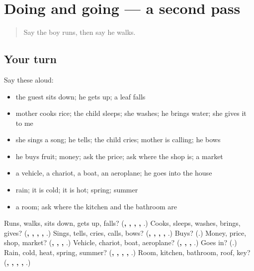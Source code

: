 \section[(dialogue)]{Doing and going — a second pass}

\label{lesson:SA-R77-second-pass-doing-and-going}



\begin{quote}
Say the boy runs, then say he walks.
\end{quote}

\subsection*{Your turn}
Say these aloud:

\begin{itemize}
\raggedright
  \item the guest sits down; he gets up; a leaf falls
  \item mother cooks rice; the child sleeps; she washes; he brings water; she gives it to me
  \item she sings a song; he tells; the child cries; mother is calling; he bows
  \item he buys fruit; money; ask the price; ask where the shop is; a market
  \item a vehicle, a chariot, a boat, an aeroplane; he goes into the house
  \item rain; it is cold; it is hot; spring; summer
  \item a room; ask where the kitchen and the bathroom are
\end{itemize}

\begin{tcolorbox}[breakable,colback=teal!4,colframe=teal!35!black,title={Before you move on}]
Runs, walks, sits down, gets up, falls? (\textbf{, , , , }.) Cooks, sleeps, washes, brings, gives? (\textbf{, , , , }.) Sings, tells, cries, calls, bows? (\textbf{, , , , }.) Buys? (\textbf{}.) Money, price, shop, market? (\textbf{, , , }.) Vehicle, chariot, boat, aeroplane? (\textbf{, , , }.) Goes in? (\textbf{}.) Rain, cold, heat, spring, summer? (\textbf{, , , , }.) Room, kitchen, bathroom, roof, key? (\textbf{, , , , }.)
\end{tcolorbox}
